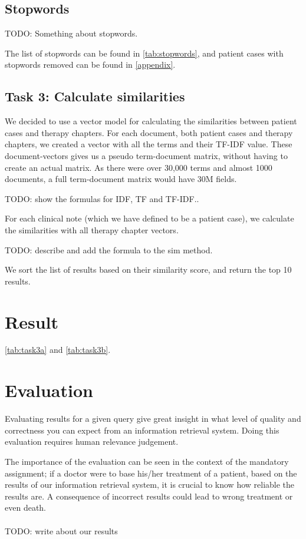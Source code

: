 \documentclass[a4paper, 12pt]{article}
\begin{document}
\subsection{Stopwords}
TODO: Something about stopwords.

The list of stopwords can be found in \autoref{tab:stopwords},
and patient cases with stopwords removed can be found in \autoref{appendix}.

\subsection{Task 3: Calculate similarities}
We decided to use a vector model for calculating the similarities between
patient cases and therapy chapters. For each document, both patient cases
and therapy chapters, we created a vector with all the terms and their
TF-IDF value. These document-vectors gives us a pseudo term-document matrix,
without having to create an actual matrix. As there were over 30,000 terms
and almost 1000 documents, a full term-document matrix would have 30M fields.

TODO: show the formulas for IDF, TF and TF-IDF..

For each clinical note (which we have defined to be a patient case), we
calculate the similarities with all therapy chapter vectors.

TODO: describe and add the formula to the sim method.

We sort the list of results based on their similarity score, and return the
top 10 results.


\section{Result}
\label{sec:result}
\autoref{tab:task3a} and \autoref{tab:task3b}.



\section{Evaluation}
\label{sec:evaluation}
Evaluating results for a given query give great insight in what level of quality and correctness you can expect from an information retrieval system. Doing this evaluation requires human relevance judgement.

The importance of the evaluation can be seen in the context of the mandatory assignment; if a doctor were to base his/her treatment of a patient, based on the results of our information retrieval system, it is crucial to know how reliable the results are. A consequence of incorrect results could lead to wrong treatment or even death.
\\
\\
TODO: write about our results
\end{document}
